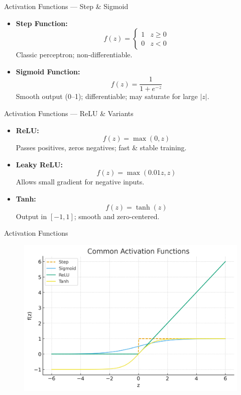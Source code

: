 \documentclass[serif, aspectratio=169]{beamer}
\begin{document}
    \begin{frame}{Activation Functions — Step & Sigmoid}
        \begin{itemize}\itemsep0.8em
        \item \textbf{Step Function:}
        \[
            f(z) =
            \begin{cases}
                1 & z \ge 0 \\
                0 & z < 0
            \end{cases}
        \]
        Classic perceptron; non-differentiable.

        \item \textbf{Sigmoid Function:}
        \[
            f(z) = \frac{1}{1 + e^{-z}}
        \]
        Smooth output (0–1); differentiable; may saturate for large \(|z|\).
        \end{itemize}
    \end{frame}

    \begin{frame}{Activation Functions — ReLU & Variants}
        \begin{itemize}\itemsep0.8em
        \item \textbf{ReLU:}
        \[
            f(z) = \max(0, z)
        \]
        Passes positives, zeros negatives; fast & stable training.

        \item \textbf{Leaky ReLU:}
        \[
            f(z) = \max(0.01z, z)
        \]
        Allows small gradient for negative inputs.

        \item \textbf{Tanh:}
        \[
            f(z) = \tanh(z)
        \]
        Output in \([-1, 1]\); smooth and zero-centered.
        \end{itemize}
    \end{frame}


    \begin{frame}{Activation Functions}
        \begin{figure}
            \centering
            \includegraphics[width=0.7\linewidth]{pic/Figure_40.png}
        \end{figure}
    \end{frame}
\end{document}
